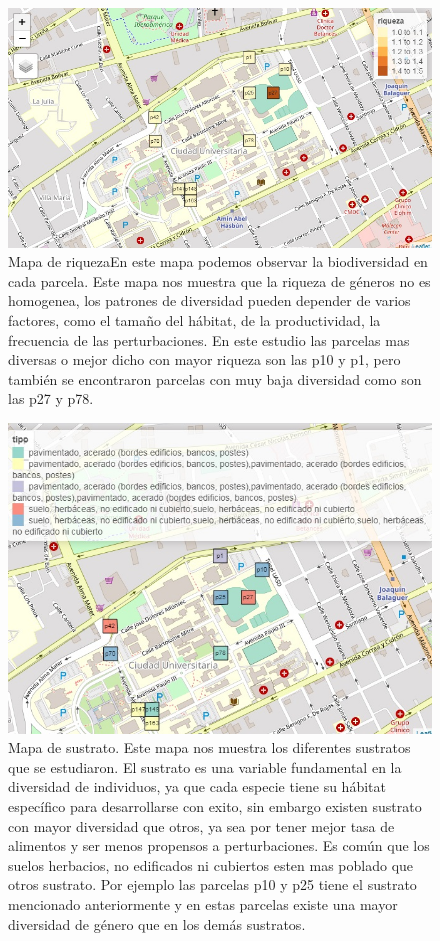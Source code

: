 \documentclass[11pt,]{article}
\begin{document}
\begin{figure}
\centering
\includegraphics{riqueza.jpg}
\caption{Mapa de riquezaEn este mapa podemos observar la biodiversidad
en cada parcela. Este mapa nos muestra que la riqueza de géneros no es
homogenea, los patrones de diversidad pueden depender de varios
factores, como el tamaño del hábitat, de la productividad, la frecuencia
de las perturbaciones. En este estudio las parcelas mas diversas o mejor
dicho con mayor riqueza son las p10 y p1, pero también se encontraron
parcelas con muy baja diversidad como son las p27 y p78.}
\end{figure}

\begin{figure}
\centering
\includegraphics{sustrato.jpg}
\caption{Mapa de sustrato. Este mapa nos muestra los diferentes
sustratos que se estudiaron. El sustrato es una variable fundamental en
la diversidad de individuos, ya que cada especie tiene su hábitat
específico para desarrollarse con exito, sin embargo existen sustrato
con mayor diversidad que otros, ya sea por tener mejor tasa de alimentos
y ser menos propensos a perturbaciones. Es común que los suelos
herbacios, no edificados ni cubiertos esten mas poblado que otros
sustrato. Por ejemplo las parcelas p10 y p25 tiene el sustrato
mencionado anteriormente y en estas parcelas existe una mayor diversidad
de género que en los demás sustratos.}
\end{figure}
\end{document}

